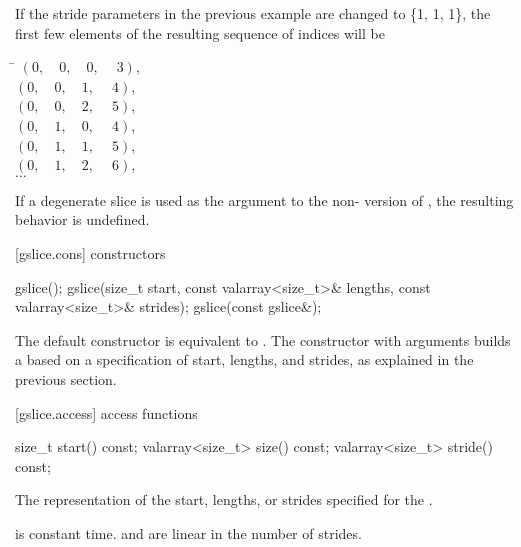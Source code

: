 \pnum
\begin{example}
If the stride parameters in the previous
example are changed to \{1, 1, 1\}, the first few elements of the
resulting sequence of indices will be

\begin{tabbing}
\hspace{.9in}\=\kill%
\>$(0,\quad 0,\quad 0,\quad \ 3)$,  \\
\>$(0,\quad 0,\quad 1,\quad \ 4)$,  \\
\>$(0,\quad 0,\quad 2,\quad \ 5)$,  \\
\>$(0,\quad 1,\quad 0,\quad \ 4)$,  \\
\>$(0,\quad 1,\quad 1,\quad \ 5)$,  \\
\>$(0,\quad 1,\quad 2,\quad \ 6)$,  \\
\>$\ldots$
\end{tabbing}
\end{example}

\pnum
If a degenerate slice is used as the argument to the
non-
version of
,
the resulting behavior is undefined.
%

[gslice.cons]{ constructors}

%
\begin{itemdecl}
gslice();
gslice(size_t start, const valarray<size_t>& lengths,
         const valarray<size_t>& strides);
gslice(const gslice&);
\end{itemdecl}

\begin{itemdescr}
\pnum
The default constructor is equivalent to
.
The constructor with arguments builds a
based on a specification of start, lengths, and strides, as explained
in the previous section.
\end{itemdescr}

[gslice.access]{ access functions}

%
%
%
\begin{itemdecl}
size_t           start()  const;
valarray<size_t> size() const;
valarray<size_t> stride() const;
\end{itemdecl}

\begin{itemdescr}
\pnum
\returns The representation of the
start, lengths, or strides specified for the .

\pnum
\complexity {} is constant time.  and 
are linear in the number of strides.
\end{itemdescr}

